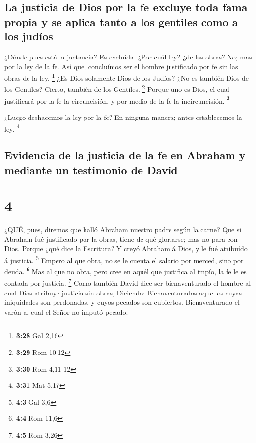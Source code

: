 \hypertarget{la-justicia-de-dios-por-la-fe-excluye-toda-fama-propia-y-se-aplica-tanto-a-los-gentiles-como-a-los-juduxedos}{%
\subsection{La justicia de Dios por la fe excluye toda fama propia y se
aplica tanto a los gentiles como a los
judíos}\label{la-justicia-de-dios-por-la-fe-excluye-toda-fama-propia-y-se-aplica-tanto-a-los-gentiles-como-a-los-juduxedos}}

 ¿Dónde pues está la jactancia? Es excluída. ¿Por cuál ley?
¿de las obras? No; mas por la ley de la fe.  Así que,
concluímos ser el hombre justificado por fe sin las obras de la ley.
\footnote{\textbf{3:28} Gal 2,16}  ¿Es Dios solamente Dios
de los Judíos? ¿No es también Dios de los Gentiles? Cierto, también de
los Gentiles. \footnote{\textbf{3:29} Rom 10,12}  Porque
uno es Dios, el cual justificará por la fe la circuncisión, y por medio
de la fe la incircuncisión. \footnote{\textbf{3:30} Rom 4,11-12}

 ¿Luego deshacemos la ley por la fe? En ninguna manera;
antes establecemos la ley. \footnote{\textbf{3:31} Mat 5,17}

\hypertarget{evidencia-de-la-justicia-de-la-fe-en-abraham-y-mediante-un-testimonio-de-david}{%
\subsection{Evidencia de la justicia de la fe en Abraham y mediante un
testimonio de
David}\label{evidencia-de-la-justicia-de-la-fe-en-abraham-y-mediante-un-testimonio-de-david}}

\hypertarget{section-3}{%
\section{4}\label{section-3}}

 ¿QUÉ, pues, diremos que halló Abraham nuestro padre según
la carne?  Que si Abraham fué justificado por la obras,
tiene de qué gloriarse; mas no para con Dios.  Porque ¿qué
dice la Escritura? Y creyó Abraham á Dios, y le fué atribuído á
justicia. \footnote{\textbf{4:3} Gal 3,6}  Empero al que
obra, no se le cuenta el salario por merced, sino por deuda. \footnote{\textbf{4:4}
  Rom 11,6}  Mas al que no obra, pero cree en aquél que
justifica al impío, la fe le es contada por justicia. \footnote{\textbf{4:5}
  Rom 3,26}  Como también David dice ser bienaventurado el
hombre al cual Dios atribuye justicia sin obras,  Diciendo:
Bienaventurados aquellos cuyas iniquidades son perdonadas, y cuyos
pecados son cubiertos.  Bienaventurado el varón al cual el
Señor no imputó pecado.

